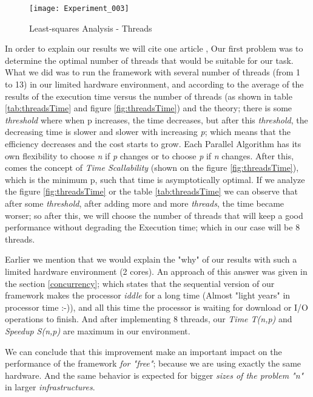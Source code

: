 \begin{figure}\centering
	\texttt{[image: Experiment\_003]}
	\caption{Least-squares Analysis - Threads}\label{fig:Experiment_003}
\end{figure}

In order to explain our results we will cite one article \cite{SF2008}, Our first problem was to determine the optimal number of threads that would be suitable for our task. What we did was to run the framework with several number of threads (from 1 to 13) in our limited hardware environment, and according to the average of the results of the execution time versus the number of threads (as shown in table \ref{tab:threadsTime} and figure \ref{fig:threadsTime}) and the theory; there is some \emph{threshold} \cite[p. 9]{T2011} where when p increases, the time decreases, but after this \emph{threshold}, the decreasing time is slower and slower with increasing \emph{p}; which means that the efficiency decreases and the cost starts to grow. Each Parallel Algorithm has its own flexibility to choose \emph{n} if \emph{p} changes or to choose \emph{p} if \emph{n} changes. After this, comes the concept of \emph{Time Scallability} (shown on the figure \ref{fig:threadsTime}), which is the minimum p, such that time is asymptotically optimal. If we analyze the figure \ref{fig:threadsTime} or the table \ref{tab:threadsTime} we can observe that after some \emph{threshold}, after adding more and more \emph{threads}, the time became worser; so after this, we will choose the number of threads that will keep a good performance without degrading the Execution time; which in our case will be 8 threads. 

Earlier we mention that we would explain the "why" of our results with such a limited hardware environment (2 cores). An approach of this answer was given in the section \ref{concurrency}; which states that the sequential version of our framework makes the processor \emph{iddle} for a long time (Almost "light years" in processor time :-)), and all this time the processor is waiting for download or I/O operations to finish. And after implementing 8 threads, our \emph{Time T(n,p)} and \emph{Speedup S(n,p)} are maximum in our environment. 

We can conclude that this improvement make an important impact on the performance of the framework \emph{for "free"}; because we are using exactly the same hardware. And the same behavior is expected for bigger \emph{sizes of the problem "n"} in larger \emph{infrastructures}.

